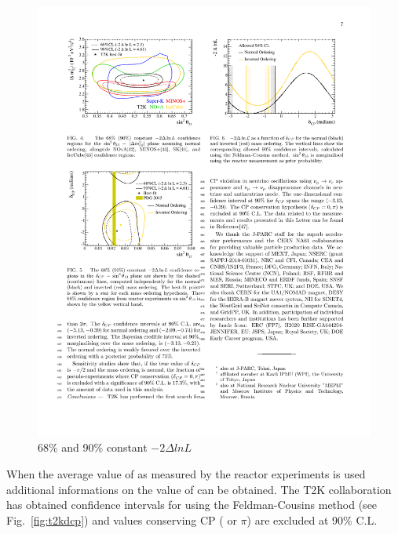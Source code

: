 \begin{figure} [h!]
\begin{center}
\includegraphics[width=14cm]{figures/t2k_joint_th13dcp.pdf}
\caption{\label{fig:t2kjoint} 68\% and 90\%  constant $-2\Delta ln L$}
\end{center}
\end{figure}


When the average value of \thint as measured by the reactor experiments is used additional informations on the value of \dcp can be obtained. The T2K collaboration has obtained confidence intervals for \dcp using the Feldman-Cousins method (see Fig.~\ref{fig:t2kdcp}) and values conserving CP ( or $\pi$) are excluded at 90\% C.L.

